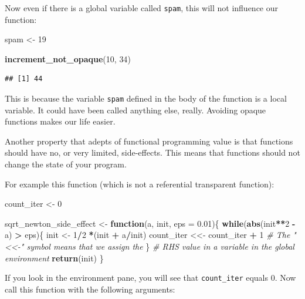 \documentclass[]{gitbook}
\newenvironment{Shaded}{\begin{snugshade}}{\end{snugshade}}
\newcommand{\CommentTok}[1]{\textcolor[rgb]{0.56,0.35,0.01}{\textit{#1}}}
\newcommand{\ControlFlowTok}[1]{\textcolor[rgb]{0.13,0.29,0.53}{\textbf{#1}}}
\newcommand{\DataTypeTok}[1]{\textcolor[rgb]{0.13,0.29,0.53}{#1}}
\newcommand{\DecValTok}[1]{\textcolor[rgb]{0.00,0.00,0.81}{#1}}
\newcommand{\FloatTok}[1]{\textcolor[rgb]{0.00,0.00,0.81}{#1}}
\newcommand{\KeywordTok}[1]{\textcolor[rgb]{0.13,0.29,0.53}{\textbf{#1}}}
\newcommand{\NormalTok}[1]{#1}
\newcommand{\OperatorTok}[1]{\textcolor[rgb]{0.81,0.36,0.00}{\textbf{#1}}}
\newcommand{\StringTok}[1]{\textcolor[rgb]{0.31,0.60,0.02}{#1}}
\theoremstyle{definition}
\theoremstyle{definition}
\theoremstyle{definition}
\theoremstyle{remark}
\begin{document}
Now even if there is a global variable called \texttt{spam}, this will
not influence our function:

\begin{Shaded}
\begin{Highlighting}[]
\NormalTok{spam <-}\StringTok{ }\DecValTok{19}

\KeywordTok{increment_not_opaque}\NormalTok{(}\DecValTok{10}\NormalTok{, }\DecValTok{34}\NormalTok{)}
\end{Highlighting}
\end{Shaded}

\begin{verbatim}
## [1] 44
\end{verbatim}

This is because the variable \texttt{spam} defined in the body of the
function is a local variable. It could have been called anything else,
really. Avoiding opaque functions makes our life easier.

Another property that adepts of functional programming value is that
functions should have no, or very limited, side-effects. This means that
functions should not change the state of your program.

For example this function (which is not a referential transparent
function):

\begin{Shaded}
\begin{Highlighting}[]
\NormalTok{count_iter <-}\StringTok{ }\DecValTok{0}

\NormalTok{sqrt_newton_side_effect <-}\StringTok{ }\ControlFlowTok{function}\NormalTok{(a, init, }\DataTypeTok{eps =} \FloatTok{0.01}\NormalTok{)\{}
    \ControlFlowTok{while}\NormalTok{(}\KeywordTok{abs}\NormalTok{(init}\OperatorTok{**}\DecValTok{2} \OperatorTok{-}\StringTok{ }\NormalTok{a) }\OperatorTok{>}\StringTok{ }\NormalTok{eps)\{}
\NormalTok{        init <-}\StringTok{ }\DecValTok{1}\OperatorTok{/}\DecValTok{2} \OperatorTok{*}\NormalTok{(init }\OperatorTok{+}\StringTok{ }\NormalTok{a}\OperatorTok{/}\NormalTok{init)}
\NormalTok{        count_iter <<-}\StringTok{ }\NormalTok{count_iter }\OperatorTok{+}\StringTok{ }\DecValTok{1} \CommentTok{# The "<<-" symbol means that we assign the}
\NormalTok{    \}                                 }\CommentTok{# RHS value in a variable in the global environment}
    \KeywordTok{return}\NormalTok{(init)}
\NormalTok{\}}
\end{Highlighting}
\end{Shaded}

If you look in the environment pane, you will see that
\texttt{count\_iter} equals 0. Now call this function with the following
arguments:
\end{document}
